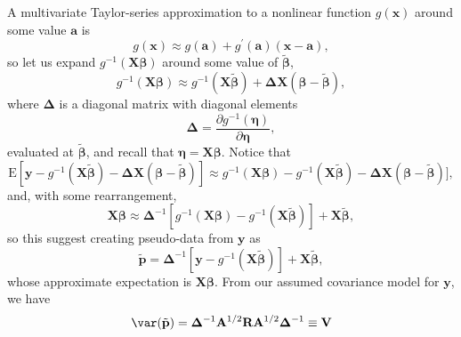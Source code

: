 \documentclass[12pt, titlepage]{article}
\begin{document}
A multivariate Taylor-series approximation to a nonlinear function $g(\mathbf{x})$ around some value $\mathbf{a}$ is
$$
g(\mathbf{x}) \approx g(\mathbf{a}) + g^{\prime}(\mathbf{a})(\mathbf{x} - \mathbf{a}),
$$
so let us expand $g^{-1}(\mathbf{X}\boldsymbol{\beta})$ around some value of $\tilde{\boldsymbol{\beta}}$,
$$
g^{-1}(\mathbf{\mathbf{X}\boldsymbol{\beta}}) \approx g^{-1}(\mathbf{X}\tilde{\boldsymbol{\beta}}) + \boldsymbol{\Delta}\mathbf{X}(\boldsymbol{\beta} - \tilde{\boldsymbol{\beta}}),
$$
where $\boldsymbol{\Delta}$ is a diagonal matrix with diagonal elements
$$
\boldsymbol{\Delta} = \frac{\partial g^{-1}(\boldsymbol{\eta})}{\partial \boldsymbol{\eta}},
$$
evaluated at $\tilde{\boldsymbol{\beta}}$, and recall that $\boldsymbol{\eta} = \mathbf{X}\boldsymbol{\beta}$.  Notice that
$$
\textrm{E}[\mathbf{y} - g^{-1}(\mathbf{X}\tilde{\boldsymbol{\beta}}) - \boldsymbol{\Delta}\mathbf{X}(\boldsymbol{\beta} - \tilde{\boldsymbol{\beta}})] \approx g^{-1}(\mathbf{X}\boldsymbol{\beta}) - g^{-1}(\mathbf{X}\tilde{\boldsymbol{\beta}}) - \boldsymbol{\Delta}\mathbf{X}(\boldsymbol{\beta} - \tilde{\boldsymbol{\beta}})],
$$
and, with some rearrangement,
$$
\mathbf{X}\boldsymbol{\beta} \approx \boldsymbol{\Delta}^{-1}[g^{-1}(\mathbf{X}\boldsymbol{\beta}) - g^{-1}(\mathbf{X}\tilde{\boldsymbol{\beta}})] + \mathbf{X}\tilde{\boldsymbol{\beta}},
$$
so this suggest creating pseudo-data from $\mathbf{y}$ as
\begin{equation} \label{eq:pseudodata}
\tilde{\mathbf{p}} = \boldsymbol{\Delta}^{-1}[\mathbf{y} - g^{-1}(\mathbf{X}\tilde{\boldsymbol{\beta}})] + \mathbf{X}\tilde{\boldsymbol{\beta}},
\end{equation}
whose approximate expectation is $\mathbf{X}\boldsymbol{\beta}$.  From our assumed covariance model for $\mathbf{y}$, we have 
$$
\var({\tilde{\mathbf{p}}}) = \boldsymbol{\Delta}^{-1}\mathbf{A}^{1/2}\mathbf{R}\mathbf{A}^{1/2}\boldsymbol{\Delta}^{-1} \equiv \mathbf{V}
$$
\end{document}
